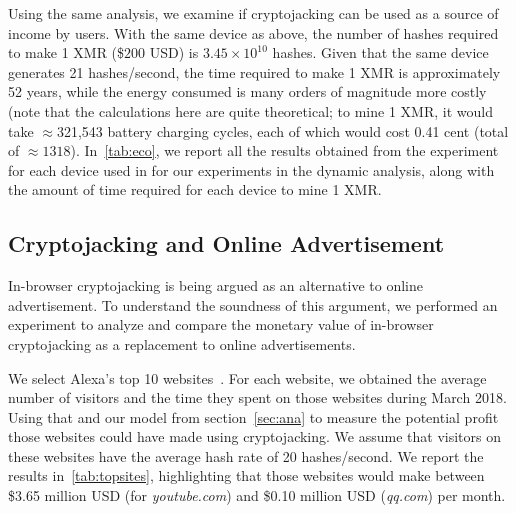 \documentclass[acmlarge]{acmart}
\newcommand{\cj}{cryptojacking\xspace}
\begin{document}
Using the same analysis, we examine if \cj can be used as a source of income by users. With the same device as above, the number of hashes required to make 1 XMR (\$$200$ USD) is  $3.45 \times 10^{10}$ hashes. Given that the same device generates 21 hashes/second, the time required to make 1 XMR is approximately 52 years, while the energy consumed is many orders of magnitude more costly (note that the calculations here are quite theoretical; to mine 1 XMR, it would take $\approx$321,543 battery charging cycles, each of which would cost  0.41 cent (total of $\approx 1318$). In~\autoref{tab:eco}, we report all the results obtained from the experiment for each device used in for our experiments in the dynamic analysis, along with the amount of time required for each device to mine 1 XMR. 




\subsection{Cryptojacking and Online Advertisement} \label{sec:mw}

In-browser \cj is being argued as an alternative to online advertisement. To understand the soundness of this argument, we performed an experiment to analyze and compare the monetary value of in-browser \cj as a replacement to online advertisements. 

We select Alexa's top 10 websites~\cite{Alexa-18}. For each website, we obtained the average number of visitors and the time they spent on those websites during March 2018. Using that and our model from section~\ref{sec:ana} to measure the potential profit those websites could have made using \cj. We assume that visitors on these websites have the average hash rate of 20 hashes/second. We report the results in~\autoref{tab:topsites}, highlighting that those websites would make between \$3.65 million USD (for \textit{youtube.com}) and \$0.10 million USD (\textit{qq.com}) per month.
\end{document}
